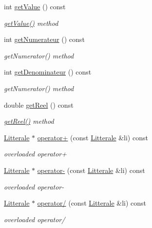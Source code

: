 \begin{DoxyCompactItemize}
int \hyperlink{class_li_rationnelle_aa84a9691ac8a8673b8397ce3fe1efcc0}{get\+Value} () const 
\begin{DoxyCompactList}\small\item\em \hyperlink{class_li_rationnelle_aa84a9691ac8a8673b8397ce3fe1efcc0}{get\+Value()} method \end{DoxyCompactList}\item 
int \hyperlink{class_li_rationnelle_aeec109595a83168a8050b3f9608ac63e}{get\+Numerateur} () const 
\begin{DoxyCompactList}\small\item\em get\+Numerator() method \end{DoxyCompactList}\item 
int \hyperlink{class_li_rationnelle_aef5786f2be1ad1c301352d75c7eb14ed}{get\+Denominateur} () const 
\begin{DoxyCompactList}\small\item\em get\+Numerator() method \end{DoxyCompactList}\item 
double \hyperlink{class_li_rationnelle_a546fd77067d7ba3593b8bf9b05d7db5c}{get\+Reel} () const 
\begin{DoxyCompactList}\small\item\em \hyperlink{class_li_rationnelle_a546fd77067d7ba3593b8bf9b05d7db5c}{get\+Reel()} method \end{DoxyCompactList}\item 
\hyperlink{class_litterale}{Litterale} $\ast$ \hyperlink{class_li_rationnelle_a6c33888d3b84585c4ca636f592d05b2f}{operator+} (const \hyperlink{class_litterale}{Litterale} \&li) const 
\begin{DoxyCompactList}\small\item\em overloaded operator+ \end{DoxyCompactList}\item 
\hyperlink{class_litterale}{Litterale} $\ast$ \hyperlink{class_li_rationnelle_a8988443214ef0712ea1f48599cfd1168}{operator-\/} (const \hyperlink{class_litterale}{Litterale} \&li) const 
\begin{DoxyCompactList}\small\item\em overloaded operator-\/ \end{DoxyCompactList}\item 
\hyperlink{class_litterale}{Litterale} $\ast$ \hyperlink{class_li_rationnelle_a0c072bf37fa144a665fc30b36eba0a4c}{operator/} (const \hyperlink{class_litterale}{Litterale} \&li) const 
\begin{DoxyCompactList}\small\item\em overloaded operator/ \end{DoxyCompactList}\item 

\end{DoxyCompactItemize}
